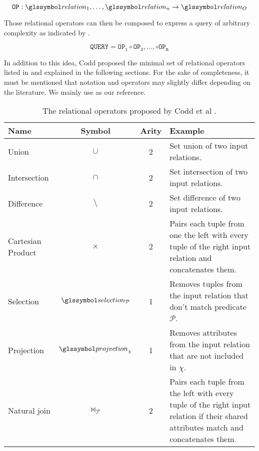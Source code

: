 \begin{equation}
    \label{equation:rel_op}
    \mathtt{OP}: \relation_1, \ldots, \relation_n \rightarrow \relation_{O}
\end{equation}

Those relational operators can then be composed to express a query of arbitrary complexity as indicated by .

\begin{equation}
    \label{equation:rel_query}
    \mathtt{QUERY} = \mathtt{OP_{1}} \circ \mathtt{OP_{2}}, \ldots , \circ \mathtt{OP_{m}}
\end{equation}

In addition to this idea, Codd proposed the minimal set of relational operators listed in  and explained in the following sections. For the sake of completeness, it must be mentioned that notation and operators may slightly differ depending on the literature. We mainly use \cite{Garcia:2009Database} as our reference.

\begin{table}
    \caption{The relational operators proposed by Codd et al \cite{Codd:1970Relational,Garcia:2009Database}.}
    \label{table:relational_operators}
    \begin{tabular}{| l | c | c | p{75mm} |}
        \hline
       \textbf{Name} & \textbf{Symbol} & \textbf{Arity}  & \textbf{Example} \\ 
        \hline
        \hline
        Union & $\cup$  & 2 & Set union of two input relations. \\
        \hline
        Intersection & $\cap$  & 2 & Set intersection of two input relations. \\
        \hline
        Difference & $\setminus$  & 2 & Set difference of two input relations. \\
        \hline
        Cartesian Product & $\times$ & 2 & Pairs each tuple from one the left with every tuple of the right input relation and concatenates them. \\
        \hline
        Selection & $\selection_{\mathcal{P}}$ &  1 & Removes tuples from the input relation that don't match predicate $\mathcal{P}$. \\
        \hline
        Projection & $\projection_{\chi}$ &  1 & Removes attributes from the input relation that are not included in $\chi$. \\
        \hline
        Natural join & $\Join_{\mathcal{P}}$ & 2 & Pairs each tuple from the left with every tuple of the right input relation if their shared attributes match and concatenates them. \\
        \hline
    \end{tabular}
\end{table}

